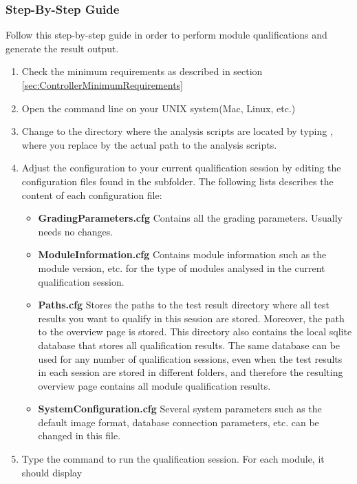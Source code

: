 \documentclass[0_Bericht]{subfiles}
\begin{document}
			\subsubsection{Step-By-Step Guide}
				Follow this step-by-step guide in order to perform module qualifications and generate the result output.
				\begin{enumerate}
					\item Check the minimum requirements as described in section \ref{sec:ControllerMinimumRequirements}
					\item Open the command line on your UNIX system(Mac, Linux, etc.)
					\item Change to the directory where the analysis scripts are located by typing , where you replace  by the actual path to the analysis scripts.
					\item Adjust the configuration to your current qualification session by editing the configuration files found in the  subfolder. The following lists describes the content of each configuration file:
						\begin{itemize}
							\item \textbf{GradingParameters.cfg} Contains all the grading parameters. Usually needs no changes.
							\item \textbf{ModuleInformation.cfg} Contains module information such as the module version, etc. for the type of modules analysed in the current qualification session.
							\item \textbf{Paths.cfg} Stores the paths to the test result directory where all test results you want to qualify in this session are stored. Moreover, the path to the overview page is stored. This directory also contains the local  sqlite database that stores all qualification results. The same database can be used for any number of qualification sessions, even when the test results in each session are stored in different folders, and therefore the resulting overview page contains all module qualification results. 
							\item \textbf{SystemConfiguration.cfg} Several system parameters such as the default image format, database connection parameters, etc. can be changed in this file.
						\end{itemize}
					\item Type the command  to run the qualification session. For each module, it should display \\

\end{enumerate}
\end{document}
